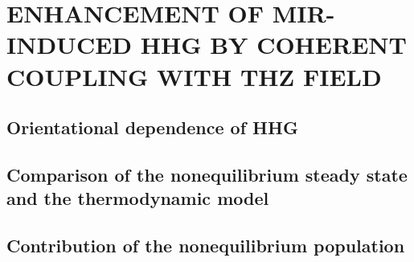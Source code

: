 \chapter{ENHANCEMENT OF MIR-INDUCED HHG BY COHERENT COUPLING WITH THZ FIELD}
\section{Orientational dependence of HHG}
\section{Comparison of the nonequilibrium steady state and the thermodynamic model}
\section{Contribution of the nonequilibrium population}